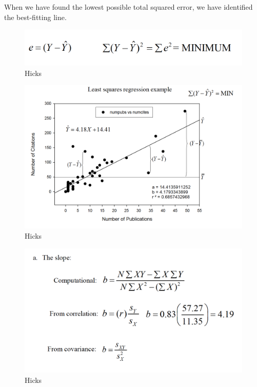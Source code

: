 \documentclass[]{book}
\theoremstyle{definition}
\theoremstyle{definition}
\theoremstyle{definition}
\theoremstyle{remark}
\begin{document}
{When we have found the lowest possible total squared error, we have
identified the best-fitting line.

\begin{figure}
\centering
\includegraphics{img/hicksreg2.png}
\caption{Hicks}
\end{figure}

\begin{figure}
\centering
\includegraphics{img/hicksreg3.png}
\caption{Hicks}
\end{figure}

\begin{figure}
\centering
\includegraphics{img/hicksreg4.png}
\caption{Hicks}
\end{figure}

}
\end{document}
